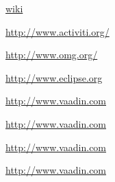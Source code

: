 \documentclass[paper=a4,twoside=false,BCOR=0mm,DIV=calc,fontsize=12pt]{scrartcl}
\begin{document}
\begin{thebibliography}{99}

 \url{wiki}

 \url{http://www.activiti.org/}

 \url{http://www.omg.org/}

 \url{http://www.eclipse.org} %

 \url{http://www.vaadin.com}

 \url{http://www.vaadin.com}

 \url{http://www.vaadin.com}

 \url{http://www.vaadin.com}

 \url{} %


 \url{}

 \url{}

 \url{}

 \url{}

 \url{}

 \url{}

 \url{}



\end{thebibliography}
\end{document}
